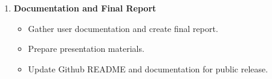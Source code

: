 \documentclass[11pt,letterpaper]{article}
\begin{document}
{\begin{enumerate}[label=\textbf{Week \arabic*:}]
    \item \textbf{Documentation and Final Report}
        \begin{itemize}
            \item Gather user documentation and create final report.
            \item Prepare presentation materials.
            \item Update Github README and documentation for public release.
        \end{itemize}


\end{enumerate}


}
\end{document}
